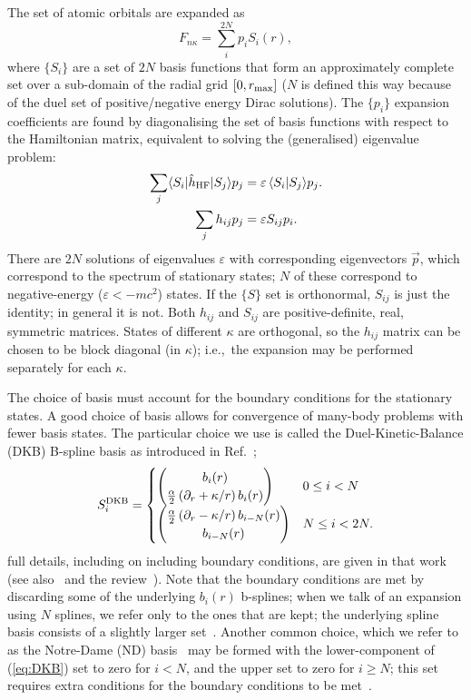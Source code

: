 \documentclass[10pt,twocolumn,a4paper]{article}%
\newcommand{\bra}[1]{\ensuremath{\langle #1|}}	%
\newcommand{\ket}[1]{\ensuremath{|#1\rangle}}
\newcommand{\braket}[1]{\ensuremath{\langle #1\rangle}}	%
\newcommand{\twocomp}[2]{\ensuremath{\begin{pmatrix}#1\\#2\end{pmatrix}}}	%
\newcommand{\be}{\begin{equation}}
\newcommand{\ee}{\end{equation}}
\def\en{\ensuremath{\varepsilon}}
\def\p{\ensuremath{\partial}}
\renewcommand{\k}{\ensuremath{\kappa}}
\begin{document}
The set of atomic orbitals are expanded as
\be
F_{n\k} = \sum_i^{2N} p_i S_i(r),
\ee
where $\{S_i\}$ are a set of $2N$ basis functions that form an approximately complete set over a sub-domain of the radial grid $[0,r_{\rm max}]$ ($N$ is defined this way because of the duel set of positive/negative energy Dirac solutions).
The $\{p_i\}$ expansion coefficients are found by diagonalising the set of basis functions with respect to the Hamiltonian matrix, equivalent to solving the (generalised) eigenvalue problem:
\begin{align}\label{eq:Hij-splines}
\sum_j\bra{S_i}\hat h_{\rm HF}\ket{S_j} p_j &= \en\,\braket{S_i|S_j} p_j.
\\
\sum_j h_{ij}p_j &= \en S_{ij}p_i.
\end{align}
There are $2N$ solutions of eigenvalues $\en$ with corresponding eigenvectors $\vec{p}$, which correspond to the spectrum of stationary states; $N$ of these correspond to negative-energy ($\en<-mc^2$) states.
If the $\{S\}$ set is orthonormal, $S_{ij}$ is just the identity; in general it is not.
Both $h_{ij}$ and $S_{ij}$ are positive-definite, real, symmetric matrices.
States of different $\k$ are orthogonal, so the $h_{ij}$ matrix can be chosen to be block diagonal (in $\k$); i.e.,\ the expansion may be performed separately for each $\kappa$. 







The choice of basis must account for the boundary conditions for the stationary states.
A good choice of basis allows for convergence of many-body problems with fewer basis states.
The particular choice we use is called the Duel-Kinetic-Balance (DKB) B-spline basis as introduced in Ref.~\cite{Beloy2008};
\be\label{eq:DKB}
S_i^{\rm DKB}= \begin{cases}
\twocomp{b_i(r)}{\frac{\alpha}{2}\left(\p_r+\kappa/r\right)b_i(r)}  &  0\leq i<N \\
\twocomp{\frac{\alpha}{2}\left(\p_r-\kappa/r\right)b_{i-N}(r)}{b_{i-N}(r)}   & N\leq i<2N.
\end{cases}
\ee
full details, including on including boundary conditions, 
are given in that work (see also~\cite{Johnson1988,AMBiT2018} and the review~\cite{Bachau2001}).
Note that the boundary conditions are met by discarding some of the underlying $b_i(r)$ b-splines; when we talk of an expansion using $N$ splines, we refer only to the ones that are kept; the underlying spline basis consists of a slightly larger set~\cite{Beloy2008}.
Another common choice, which we refer to as the Notre-Dame (ND) basis~\cite{Johnson1988} may be formed with the lower-component of (\ref{eq:DKB}) set to zero for $i<N$, and the upper set to zero for $i\geq N$; this set requires extra conditions for the boundary conditions to be met~\cite{Johnson1988}.
\end{document}
